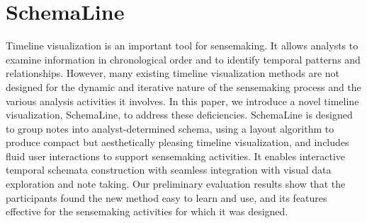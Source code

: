 \chapter{SchemaLine}

\graphicspath{{Chapter3/figures/}}

Timeline visualization is an important tool for sensemaking. It allows analysts to examine information in chronological order and to identify temporal patterns and relationships. However, many existing timeline visualization methods are not designed for the dynamic and iterative nature of the sensemaking process and the various analysis activities it involves. In this paper, we introduce a novel timeline visualization, SchemaLine, to address these deficiencies. SchemaLine is designed to group notes into analyst-determined schema, using a layout algorithm to produce compact but aesthetically pleasing timeline visualization, and includes fluid user interactions to support sensemaking activities. It enables interactive temporal schemata construction with seamless integration with visual data exploration and note taking. Our preliminary evaluation results show that the participants found the new method easy to learn and use, and its features effective for the sensemaking activities for which it was designed.


%





